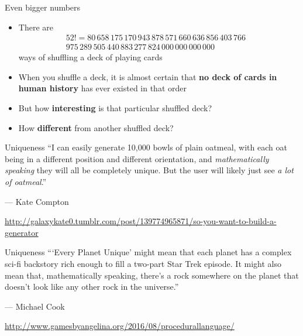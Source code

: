 \begin{frame}{Even bigger numbers}
	\begin{itemize}
		\pause\item There are
			\begin{align*}
		 		52! = 80\,658\,175\,170\,943\,878\,571\,660\,636\,856\,403\,766 &\\
		 		          975\,289\,505\,440\,883\,277\,824\,000\,000\,000\,000 &
		 	\end{align*}
			ways of shuffling a deck of playing cards
		\pause\item When you shuffle a deck, it is almost certain that
			\textbf{no deck of cards in human history} has ever existed in that order
		\pause\item But how \textbf{interesting} is that particular shuffled deck?
		\pause\item How \textbf{different} from another shuffled deck?
	\end{itemize}
\end{frame}

\begin{frame}{Uniqueness}
	``I can easily generate 10,000 bowls of plain oatmeal, with each oat being in a different position 
	and different orientation, and \textit{mathematically speaking} they will all be completely unique.
	But the user will likely just see \textit{a lot of oatmeal}.''
	
	--- Kate Compton
	
	{\tiny\url{http://galaxykate0.tumblr.com/post/139774965871/so-you-want-to-build-a-generator}}
\end{frame}

\begin{frame}{Uniqueness}
	``\thinspace`Every Planet Unique' might mean that each planet has a complex sci-fi backstory rich enough to 
	fill a two-part Star Trek episode.
	It might also mean that, mathematically speaking, there's a rock somewhere on the planet that
	doesn't look like any other rock in the universe.''
	
	--- Michael Cook

	{\tiny\url{http://www.gamesbyangelina.org/2016/08/procedurallanguage/}}
\end{frame}


